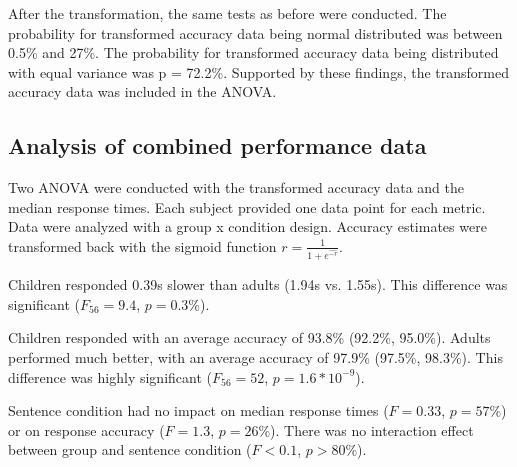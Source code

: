 After the transformation, the same tests as before were conducted.
The probability for transformed accuracy data being normal distributed was between 0.5\% and 27\%.
The probability for transformed accuracy data being distributed with equal variance was p = 72.2\%.
Supported by these findings, the transformed accuracy data was included in the ANOVA.

\subsection{Analysis of combined performance data}

Two ANOVA were conducted with the transformed accuracy data and the median response times.
Each subject provided one data point for each metric.
Data were analyzed with a group x condition design.
Accuracy estimates were transformed back with the sigmoid function $r = \frac{1}{1+e^{\hat{-r}}}$.

Children responded 0.39s slower than adults (1.94s vs. 1.55s).
This difference was significant ($F_{56} = 9.4$, $p = 0.3\%$).

Children responded with an average accuracy of 93.8\% (92.2\%, 95.0\%).
Adults performed much better, with an average accuracy of 97.9\% (97.5\%, 98.3\%).
This difference was highly significant ($F_{56} = 52$, $p = 1.6*10^{-9}$).

Sentence condition had no impact on median response times ($F = 0.33$, $p = 57\%$) or on response accuracy ($F = 1.3$, $p = 26\%$).
There was no interaction effect between group and sentence condition ($F < 0.1$, $p > 80\%$).

